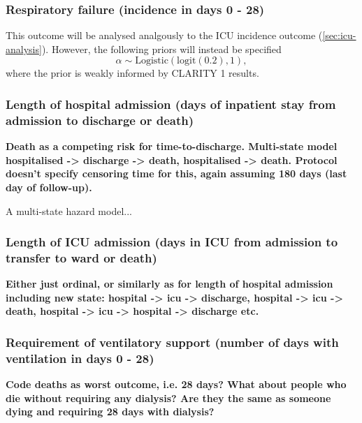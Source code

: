 \documentclass[11pt,parskip=half-]{scrartcl}
\begin{document}
\subsubsection{Respiratory failure (incidence in days 0 - 28)}
This outcome will be analysed analgously to the ICU incidence outcome (\ref{sec:icu-analysis}). However, the following priors will instead be specified
$$
    \alpha \sim \text{Logistic}(\text{logit}(0.2), 1),
$$
where the prior is weakly informed by CLARITY 1 results.

\subsubsection{Length of hospital admission (days of inpatient stay from admission to discharge or death)}

\textbf{Death as a competing risk for time-to-discharge. Multi-state model hospitalised -> discharge -> death, hospitalised -> death. Protocol doesn't specify censoring time for this, again assuming 180 days (last day of follow-up).}

A multi-state hazard model...

\subsubsection{Length of ICU admission (days in ICU from admission to transfer to ward or death)}

\textbf{Either just ordinal, or similarly as for length of hospital admission including new state: hospital -> icu -> discharge, hospital -> icu -> death, hospital -> icu -> hospital -> discharge etc.}

\subsubsection{Requirement of ventilatory support (number of days with ventilation in days 0 - 28)}\label{sec:vent-support}

\textbf{Code deaths as worst outcome, i.e. 28 days? What about people who die without requiring any dialysis? Are they the same as someone dying and requiring 28 days with dialysis?}
\end{document}
